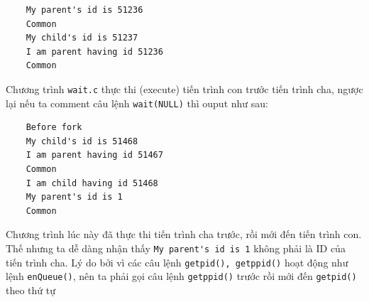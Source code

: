 \documentclass{article}
\begin{document}
\begin{enumerate}
\begin{verbatim}
    My parent's id is 51236                                                                                                                                                                                        
    Common                                                                                                                                                                                                         
    My child's id is 51237                                                                                                                                                                                         
    I am parent having id 51236                                                                                                                                                                                    
    Common  
\end{verbatim}
Chương trình \verb|wait.c| thực thi (execute) tiến trình con trước tiến trình cha, ngược lại nếu ta comment câu lệnh \verb|wait(NULL)| thì ouput như sau:
\begin{verbatim}
    Before fork      
    My child's id is 51468                                                                                                                                                                                                                                                                                                                                                       
    I am parent having id 51467                                                                                                                                                                   
    Common                                                                                                                             
    I am child having id 51468  
    My parent's id is 1                                                                                                                                                                                                                                                                                                                                                                   
    Common
\end{verbatim}
Chương trình lúc này đã thực thi tiến trình cha trước, rồi mới đến tiến trình con. Thế nhưng ta dễ dàng nhận thấy \verb|My parent's id is 1| không phải là ID của tiến trình cha.
Lý do bởi vì các câu lệnh \verb|getpid(), getppid()| hoạt động như lệnh \verb|enQueue()|, nên ta phải gọi câu lệnh \verb|getppid()| trước rồi mới đến \verb|getpid()| theo thứ tự

\end{enumerate}
\end{document}
